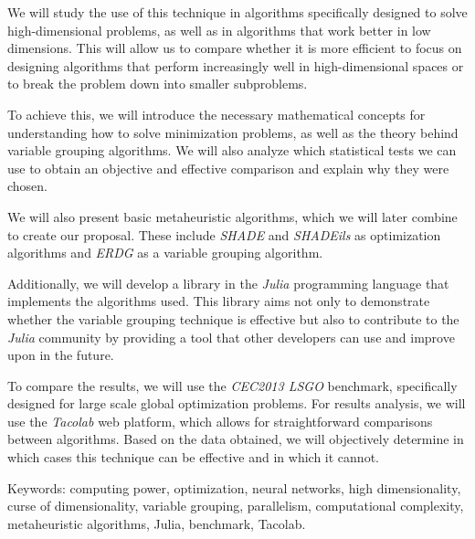 We will study the use of this technique in algorithms specifically designed to solve high-dimensional problems, as well as in algorithms that work better in low dimensions. This will allow us to compare whether it is more efficient to focus on designing algorithms that perform increasingly well in high-dimensional spaces or to break the problem down into smaller subproblems.

To achieve this, we will introduce the necessary mathematical concepts for understanding how to solve minimization problems, as well as the theory behind variable grouping algorithms. We will also analyze which statistical tests we can use to obtain an objective and effective comparison and explain why they were chosen.

We will also present basic metaheuristic algorithms, which we will later combine to create our proposal. These include \textit{SHADE} and \textit{SHADEils} as optimization algorithms and \textit{ERDG} as a variable grouping algorithm.

Additionally, we will develop a library in the \textit{Julia} programming language that implements the algorithms used. This library aims not only to demonstrate whether the variable grouping technique is effective but also to contribute to the \textit{Julia} community by providing a tool that other developers can use and improve upon in the future.

To compare the results, we will use the \textit{CEC2013 LSGO} benchmark, specifically designed for large scale global optimization problems. For results analysis, we will use the \textit{Tacolab} web platform, which allows for straightforward comparisons between algorithms. Based on the data obtained, we will objectively determine in which cases this technique can be effective and in which it cannot.

Keywords: computing power, optimization, neural networks, high dimensionality, curse of dimensionality, variable grouping, parallelism, computational complexity, metaheuristic algorithms, Julia, benchmark, Tacolab.

\endinput
